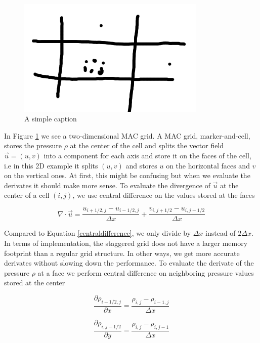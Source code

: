 \begin{figure}[ht!]
\centering
\includegraphics[width=90mm]{ch2/2d.png}
\caption{A simple caption}
\label{macgrid}
\end{figure}

In Figure \ref{macgrid} we see a two-dimensional MAC grid. A MAC grid, marker-and-cell, stores the pressure $\rho$ at the center of the cell and splits the vector field $\vec{u} = (u,v)$ into a component for each axis and store it on the faces of the cell, i.e in this 2D example it splits $(u,v)$ and stores $u$ on the horizontal faces and $v$ on the vertical ones. At first, this might be confusing but when we evaluate the derivates it should make more sense. To evaluate the divergence of $\vec{u}$ at the center of a cell $(i,j)$, we use central difference on the values stored at the faces

\begin{equation}
\nabla \cdot \vec{u} = \frac{u_{i+1/2,j} - u_{i-1/2,j}}{\Delta x} + 
                       \frac{v_{i,j+1/2} - u_{i,j-1/2}}{\Delta x}
\end{equation}

Compared to Equation \ref{centraldifference}, we only divide by $\Delta x$ instead of $2\Delta x$. In terms of implementation, the staggered grid does not have a larger memory footprint than a regular grid structure. In other ways, we get more accurate derivates without slowing down the performance. To evaluate the derivate of the pressure $\rho$ at a face we perform central difference on neighboring pressure values stored at the center

\begin{equation}
\frac{\partial \rho_{i-1/2,j}}{\partial x} = \frac{\rho_{i,j} - \rho_{i-1,j}}{\Delta x}
\end{equation}

\begin{equation}
\frac{\partial \rho_{i,j-1/2}}{\partial y} = \frac{\rho_{i,j} - \rho_{i,j-1}}{\Delta x}
\end{equation}
